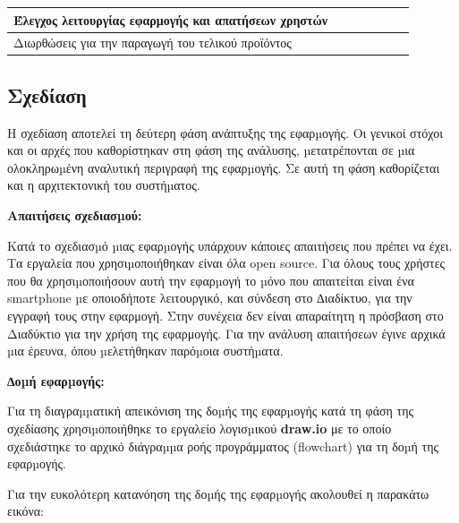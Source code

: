 \documentclass[a4paper,12pt]{article}
\begin{document}
\begin{table}[htb]
{{\begin{tabular}{|l|l|l|l|l|l|l|}
			Έλεγχος λειτουργίας εφαρμογής και απατήσεων χρηστών &                          &                          &                          &                          &                          & \cellcolor[HTML]{D14A47} \\ \hline
			Διωρθώσεις για την παραγωγή του τελικού προϊόντος   &                          &                          &                          &                          &                          & \cellcolor[HTML]{D14A47} \\ \hline
			\end{tabular}%
			}
			}
		\end{table}
		\newpage
		\subsection{Σχεδίαση}
		Η σχεδίαση αποτελεί τη δεύτερη φάση ανάπτυξης της εφαρµογής. Οι
		γενικοί στόχοι και οι αρχές που καθορίστηκαν στη φάση της ανάλυσης, µετατρέπονται
		σε µια ολοκληρωµένη αναλυτική περιγραφή της εφαρµογής. Σε αυτή τη φάση
		καθορίζεται και η αρχιτεκτονική του συστήµατος.

		\textbf{Απαιτήσεις σχεδιασµού:}

		Κατά το σχεδιασµό µιας εφαρµογής υπάρχουν κάποιες απαιτήσεις που πρέπει να
		έχει. Τα εργαλεία που χρησιµοποιήθηκαν είναι όλα open source. Για όλους τους
		χρήστες που θα χρησιµοποιήσουν αυτή την εφαρµογή το µόνο που απαιτείται είναι
		ένα smartphone µε οποιοδήποτε λειτουργικό, και σύνδεση στο ∆ιαδίκτυο, για την 
		εγγραφή τους στην εφαρμογή. Στην συνέχεια δεν είναι απαραίτητη η πρόσβαση στο
		Διαδύκτιο για την χρήση της εφαρμογής. 
		Για την ανάλυση απαιτήσεων έγινε αρχικά µια
		έρευνα, όπου µελετήθηκαν παρόµοια συστήµατα.

		\textbf{∆οµή εφαρµογής:}

 		Για τη διαγραµµατική απεικόνιση της δοµής της εφαρµογής κατά τη φάση της
		σχεδίασης χρησιµοποιήθηκε το εργαλείο λογισµικού \textbf{draw.io} με το οποίο
		σχεδιάστηκε το αρχικό διάγραµµα ροής προγράμματος (flowchart) για τη δοµή της εφαρµογής. 
		
		Για την ευκολότερη κατανόηση της δοµής της εφαρµογής ακολουθεί η παρακάτω εικόνα:
\end{document}

